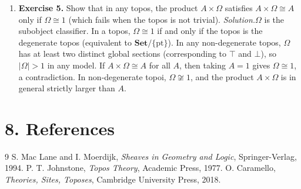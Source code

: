 \begin{enumerate}[leftmargin=*,itemsep=0.9em]
\item \textbf{Exercise 5.} Show that in any topos, the product $A \times \Omega$ satisfies $A \times \Omega \cong A$ only if $\Omega \cong 1$ (which fails when the topos is not trivial). \emph{Solution.}$\Omega$ is the subobject classifier. In a topos, $\Omega \cong 1$ if and only if the topos is the degenerate topos (equivalent to $\mathbf{Set}/\{\text{pt}\}$). In any non-degenerate topos, $\Omega$ has at least two distinct global sections (corresponding to $\top$ and $\bot$), so $|\Omega| > 1$ in any model. If $A \times \Omega \cong A$ for all $A$, then taking $A = 1$ gives $\Omega \cong 1$, a contradiction. In non-degenerate topoi, $\Omega \not\cong 1$, and the product $A \times \Omega$ is in general strictly larger than $A$.

\end{enumerate}
\section*{8. References}
\begin{thebibliography}{9}
 S. Mac Lane and I. Moerdijk, \emph{Sheaves in Geometry and Logic}, Springer-Verlag, 1994.
 P. T. Johnstone, \emph{Topos Theory}, Academic Press, 1977.
 O. Caramello, \emph{Theories, Sites, Toposes}, Cambridge University Press, 2018.
\end{thebibliography}
